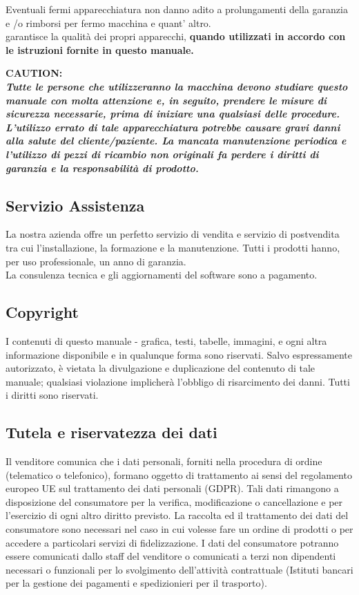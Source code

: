 \documentclass[a4paper]{article}
\begin{document}
Eventuali fermi apparecchiatura non danno adito a prolungamenti della garanzia e /o rimborsi per fermo macchina e quant' altro.\\
garantisce la qualità dei propri apparecchi, \textbf{quando utilizzati in accordo con le istruzioni fornite in questo manuale.}

\vspace{10pt}
\noindent \faExclamationTriangle \textbf{CAUTION:} 
\\
\textbf{\textit{Tutte le persone che utilizzeranno la macchina devono studiare questo manuale con molta attenzione e, in seguito, prendere le misure di sicurezza necessarie, prima di iniziare una qualsiasi delle procedure. L'utilizzo errato di tale apparecchiatura potrebbe causare gravi danni alla salute del cliente/paziente. La mancata manutenzione periodica e l'utilizzo di pezzi di ricambio non originali fa perdere i diritti di garanzia e la responsabilità di prodotto.}}

\subsection{Servizio Assistenza}
La nostra azienda offre un perfetto servizio di vendita e servizio di postvendita tra cui l'installazione, la formazione e la manutenzione. Tutti i prodotti hanno, per uso professionale, un anno di garanzia.\\
La consulenza tecnica e gli aggiornamenti del software sono a pagamento.

\subsection{\faCopyright[regular] Copyright}
I contenuti di questo manuale - grafica, testi, tabelle, immagini, e ogni altra informazione disponibile e in qualunque forma sono riservati. Salvo espressamente autorizzato, è vietata la divulgazione e duplicazione del contenuto di tale manuale; qualsiasi violazione implicherà l'obbligo di risarcimento dei danni. Tutti i diritti sono riservati.

\subsection{Tutela e riservatezza dei dati}
Il venditore comunica che i dati personali, forniti nella procedura di ordine (telematico o telefonico), formano oggetto di trattamento ai sensi del regolamento europeo UE sul trattamento dei dati personali (GDPR). Tali dati rimangono a disposizione del consumatore per la verifica, modificazione o cancellazione e per l'esercizio di ogni altro diritto previsto. La raccolta ed il trattamento dei dati del consumatore sono necessari nel caso in cui volesse fare un ordine di prodotti o per accedere a particolari servizi di fidelizzazione. I dati del consumatore potranno essere comunicati dallo staff del venditore o comunicati a terzi non dipendenti necessari o funzionali per lo svolgimento dell'attività contrattuale (Istituti bancari per la gestione dei pagamenti e spedizionieri per il trasporto).
\end{document}
